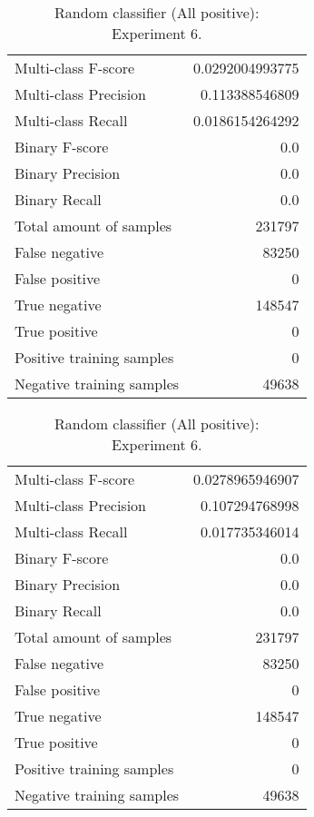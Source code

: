 \begin{table}[H]
\begin{minipage}{0.5\textwidth}
\caption{Random classifier (All positive): \\Experiment 5.}
\centering
\begin{tabular}{l r}
\toprule
Multi-class F-score & 0.0292004993775 \\
Multi-class Precision & 0.113388546809 \\
Multi-class Recall & 0.0186154264292 \\
\midrule
Binary F-score & 0.0 \\
Binary Precision & 0.0 \\
Binary Recall & 0.0 \\
\midrule
Total amount of samples & 231797 \\
False negative & 83250 \\
False positive & 0 \\
True negative & 148547 \\
True positive & 0 \\
\midrule
Positive training samples & 0 \\
Negative training samples & 49638 \\
\bottomrule
\end{tabular}
\end{minipage}
\hfillx
\begin{minipage}{0.5\textwidth}
\caption{Random classifier (All positive): \\Experiment 6.}
\centering
\begin{tabular}{l r}
\toprule
Multi-class F-score & 0.0278965946907 \\
Multi-class Precision & 0.107294768998 \\
Multi-class Recall & 0.017735346014 \\
\midrule
Binary F-score & 0.0 \\
Binary Precision & 0.0 \\
Binary Recall & 0.0 \\
\midrule
Total amount of samples & 231797 \\
False negative & 83250 \\
False positive & 0 \\
True negative & 148547 \\
True positive & 0 \\
\midrule
Positive training samples & 0 \\
Negative training samples & 49638 \\
\bottomrule
\end{tabular}
\end{minipage}
\end{table}
